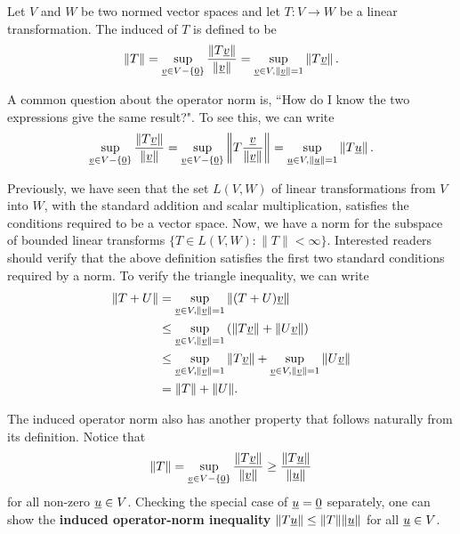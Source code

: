 \begin{definition}
Let $V$ and $W$ be two normed vector spaces and let $T \colon V \rightarrow W$ be a linear transformation.
The induced  of $T$ is defined to be
\begin{equation*}
\left\| T \right\|
= \sup_{ \underline{v} \in V - \left\{ \underline{0} \right\} }
\frac{ \left\| T \underline{v} \right\| }{ \left\| \underline{v} \right\| }
= \sup_{\underline{v} \in V, \left\| \underline{v} \right\| = 1 }
\left\| T \underline{v} \right\| .
\end{equation*}
\end{definition}

A common question about the operator norm is, ``How do I know the two expressions give the same result?".
To see this, we can write
\begin{equation*}
\sup_{ \underline{v} \in V - \left\{ \underline{0} \right\} }
\frac{ \left\| T \underline{v} \right\| }{ \left\| \underline{v} \right\| }
= \sup_{ \underline{v} \in V - \left\{ \underline{0} \right\} }
\left\| T \frac{\underline{v}}{\| \underline{v} \|} \right\|
= \sup_{\underline{u} \in V, \left\| \underline{u} \right\| = 1 }
\left\| T \underline{u} \right\| .
\end{equation*}

Previously, we have seen that the set $L(V,W)$ of linear transformations from $V$ into $W$, with the standard addition and scalar multiplication, satisfies the conditions required to be a vector space.
Now, we have a norm for the subspace of bounded linear transforms $\{T\in L(V,W):\|T\|<\infty\}$.
Interested readers should verify that the above definition satisfies the first two standard conditions required by a norm.
To verify the triangle inequality, we can write
\begin{align*}
\| T + U \| &= \sup_{\underline{v} \in V, \left\| \underline{v} \right\| = 1 }
\left\| (T+U) \underline{v} \right\| \\
&\leq  \sup_{\underline{v} \in V, \left\| \underline{v} \right\| = 1 }
\left(  \left\| T \underline{v} \right\| + \left\| U \underline{v} \right\| \right) \\
& \leq \sup_{\underline{v} \in V, \left\| \underline{v} \right\| = 1 }
\left\| T \underline{v} \right\| + \sup_{\underline{v} \in V, \left\| \underline{v} \right\| = 1 }
\left\| U \underline{v} \right\| \\
&= \|T\| + \|U\|.
\end{align*}

The induced operator norm also has another property that follows naturally from its definition.
Notice that 
\[ \| T \| = \sup_{ \underline{v} \in V - \left\{ \underline{0} \right\} }
\frac{ \left\| T \underline{v} \right\| }{ \left\| \underline{v} \right\| } \geq \frac{ \left\| T \underline{u} \right\| }{ \left\| \underline{u} \right\| } \]
for all non-zero $\underline{u} \in V$.
Checking the special case of $\underline{u}=\underline{0}$ separately, one can show the \textbf{induced operator-norm inequality} $\| T \underline{u} \| \leq \| T \| \| \underline{u} \|$ for all $\underline{u}\in V$.

